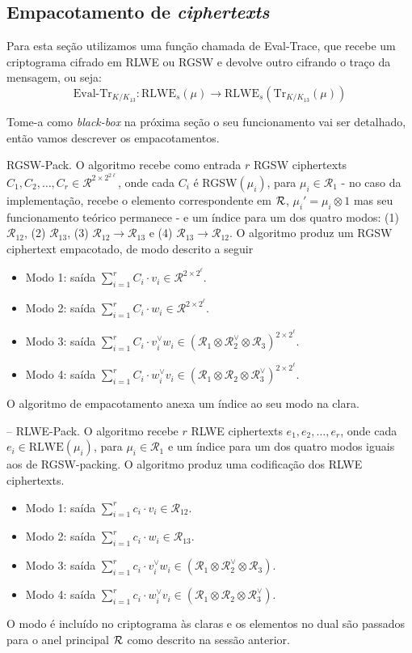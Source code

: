 \subsection{Empacotamento de \textit{ciphertexts}}

Para esta seção utilizamos uma função chamada de Eval-Trace, que recebe um criptograma cifrado em RLWE ou RGSW e devolve outro cifrando o traço da mensagem, ou seja:
$$
\text{Eval-Tr}_{K/K_{13}} : \text{RLWE}_s(\mu) \rightarrow \text{RLWE}_s(\text{Tr}_{K/K_{13}}(\mu))
$$

Tome-a como \textit{black-box} na próxima seção o seu funcionamento vai ser detalhado, então vamos descrever os empacotamentos.


RGSW-Pack. O algoritmo recebe como entrada $r$ RGSW ciphertexts $C_1, C_2, \ldots, C_r \in \mathcal{R}^{2 \times 2^{2\ell}}$, onde cada $C_i$ é RGSW$(\mu_i)$, para $\mu_i \in \mathcal{R}_1$ - no caso da implementação,
recebe o elemento correspondente em $\mathcal{R}$, $\mu_i' = \mu_i \otimes 1$ mas seu funcionamento teórico permanece - e um índice para um dos quatro modos: (1) $\mathcal{R}_{12}$, (2) $\mathcal{R}_{13}$, (3) $\mathcal{R}_{12} \rightarrow \mathcal{R}_{13}$ e (4) $\mathcal{R}_{13} \rightarrow \mathcal{R}_{12}$. O algoritmo produz um RGSW ciphertext empacotado,
de modo descrito a seguir
\begin{itemize}
    \item Modo 1: saída $\sum_{i=1}^r C_i \cdot v_i \in \mathcal{R}^{2 \times 2^\ell}$.
    \item Modo 2: saída $\sum_{i=1}^r C_i \cdot w_i \in \mathcal{R}^{2 \times 2^\ell}$.
    \item Modo 3: saída $\sum_{i=1}^r C_i \cdot v_i^\vee w_i \in (\mathcal{R}_1 \otimes \mathcal{R}_2^\vee \otimes \mathcal{R}_3)^{2 \times 2^\ell}$.
    \item Modo 4: saída $\sum_{i=1}^r C_i \cdot w_i^\vee v_i \in (\mathcal{R}_1 \otimes \mathcal{R}_2 \otimes \mathcal{R}_3^\vee)^{2 \times 2^\ell}$.
\end{itemize}
O algoritmo de empacotamento anexa um índice ao seu modo na clara.

-- RLWE-Pack. O algoritmo recebe $r$ RLWE ciphertexts $e_1, e_2, \ldots, e_r$, onde cada $e_i \in \text{RLWE}(\mu_i)$, para $\mu_i \in \mathcal{R}_1$ e um índice para um dos quatro modos iguais aos de RGSW-packing. O algoritmo produz uma codificação dos RLWE ciphertexts.

\begin{itemize}
    \item Modo 1: saída $\sum_{i=1}^r c_i \cdot v_i \in \mathcal{R}_{12}$.
    \item Modo 2: saída $\sum_{i=1}^r c_i \cdot w_i \in \mathcal{R}_{13}$.
    \item Modo 3: saída $\sum_{i=1}^r c_i \cdot v_i^\vee w_i \in (\mathcal{R}_1 \otimes \mathcal{R}_2^\vee \otimes \mathcal{R}_3)$.
    \item Modo 4: saída $\sum_{i=1}^r c_i \cdot w_i^\vee v_i \in (\mathcal{R}_1 \otimes \mathcal{R}_2 \otimes \mathcal{R}_3^\vee)$.
\end{itemize}
O modo é incluído no criptograma às claras e os elementos no dual são passados para o anel principal $\mathcal{R}$ como descrito na sessão anterior.

